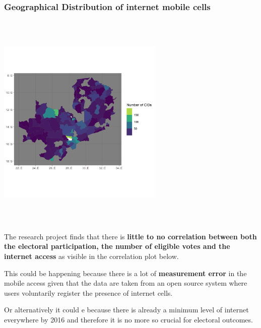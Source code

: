 \documentclass[
]{article}
\begin{document}
\hypertarget{geographical-distribution-of-internet-mobile-cells}{%
\subsubsection{Geographical Distribution of internet mobile
cells}\label{geographical-distribution-of-internet-mobile-cells}}

\includegraphics[width=3.125in,height=4.16667in]{treat1.png}

The research project finds that there is \textbf{little to no
correlation between both the electoral participation, the number of
eligible votes and the internet access} as visible in the correlation
plot below.

This could be happening because there is a lot of \textbf{measurement
error} in the mobile access given that the data are taken from an open
source system where users voluntarily register the presence of internet
cells.

Or alternatively it could e because there is already a minimum level of
internet everywhere by 2016 and therefore it is no more so crucial for
electoral outcomes.
\end{document}
